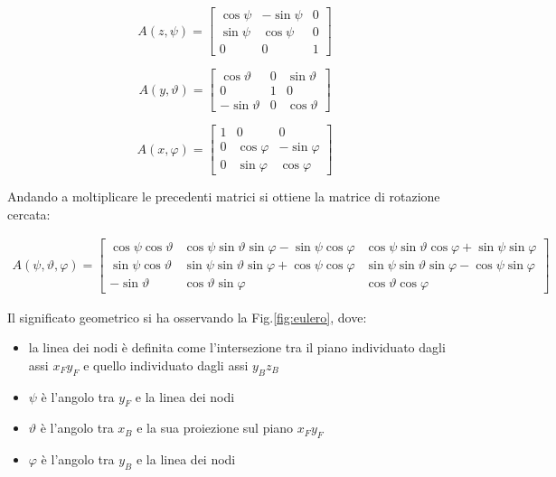 \begin{equation}
A(z,\psi)= \begin{bmatrix}
\cos\psi   &-\sin\psi & 0 \\
\sin\psi     & \cos\psi  & 0 \\
0      & 0 & 1
\end{bmatrix}
\end{equation}

\begin{equation}
A(y,\vartheta)= \begin{bmatrix}
\cos\vartheta   &0 & \sin\vartheta \\
0    & 1  & 0 \\
-\sin\vartheta     & 0 & \cos\vartheta
\end{bmatrix}
\end{equation}


\begin{equation}
A(x,\varphi)= \begin{bmatrix}
1   &0 & 0 \\
0    & \cos\varphi  & -\sin\varphi\\
0     & \sin\varphi & \cos\varphi
\end{bmatrix}
\end{equation}

Andando a moltiplicare le precedenti matrici si ottiene la matrice di rotazione cercata:

\begin{eqnarray}
A(\psi,\vartheta,\varphi)= \begin{bmatrix}
\cos\psi \cos\vartheta  & \cos\psi \sin\vartheta \sin\varphi-\sin\psi \cos\varphi & \cos\psi \sin\vartheta \cos\varphi + \sin\psi \sin\varphi \\
\sin\psi \cos\vartheta    & \sin\psi \sin\vartheta \sin\varphi+\cos\psi \cos\varphi & \sin\psi \sin\vartheta \sin\varphi - \cos\psi \sin\varphi\\
-\sin\vartheta    & \cos\vartheta\sin\varphi & \cos\vartheta\cos\varphi
\end{bmatrix}
\end{eqnarray}

Il significato geometrico si ha osservando la Fig.\ref{fig:eulero}, dove:
\begin{itemize}
	\item la linea dei nodi è definita come l'intersezione tra il piano individuato dagli assi $x_Fy_F$ e quello individuato dagli assi $y_Bz_B$
	\item $\psi$ è l'angolo tra $y_F$ e la linea dei nodi
	\item $\vartheta$ è l'angolo tra $x_B$ e la sua proiezione sul piano $x_Fy_F$
	\item $\varphi$ è l'angolo tra $y_B$ e la linea dei nodi
\end{itemize}

